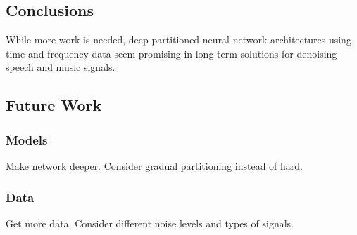 \subsection{Conclusions}
While more work is needed, deep partitioned neural network architectures using time and frequency data seem promising in long-term solutions for denoising speech and music signals.

\subsection{Future Work}
\subsubsection{Models}
Make network deeper. Consider gradual partitioning instead of hard.

\subsubsection{Data}
Get more data. Consider different noise levels and types of signals.
